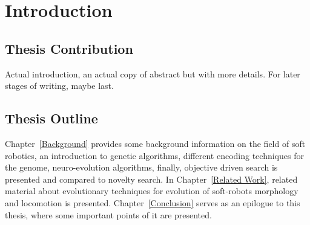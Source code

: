 
\chapter{Introduction} %

\label{Chapter1} %



\section{Thesis Contribution}

Actual introduction, an actual copy of abstract but with more details. For later stages of writing, maybe last.



\section{Thesis Outline}

Chapter~\ref{Background} provides some background information on the field of soft robotics, an introduction to genetic algorithms, different encoding techniques for the genome, neuro-evolution algorithms, finally, objective driven search is presented and compared to novelty search. In Chapter~\ref{Related Work}, related material about evolutionary techniques for evolution of soft-robots morphology and locomotion is presented. Chapter~\ref{Conclusion} serves as an epilogue to this thesis, where some important points of it are presented.